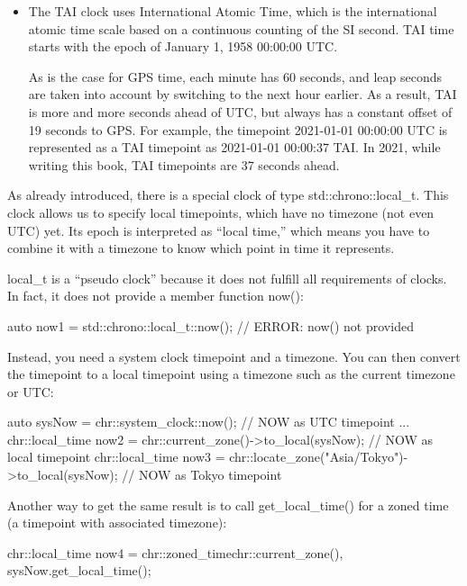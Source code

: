 \begin{itemize}
\item
The TAI clock uses International Atomic Time, which is the international atomic time scale based on a continuous counting of the SI second. TAI time starts with the epoch of January 1, 1958 00:00:00 UTC.

As is the case for GPS time, each minute has 60 seconds, and leap seconds are taken into account by switching to the next hour earlier. As a result, TAI is more and more seconds ahead of UTC, but always has a constant offset of 19 seconds to GPS. For example, the timepoint 2021-01-01 00:00:00 UTC is represented as a TAI timepoint as 2021-01-01 00:00:37 TAI. In 2021, while writing this book, TAI timepoints are 37 seconds ahead.
\end{itemize}


As already introduced, there is a special clock of type std::chrono::local\_t. This clock allows us to specify local timepoints, which have no timezone (not even UTC) yet. Its epoch is interpreted as “local time,” which means you have to combine it with a timezone to know which point in time it represents.

local\_t is a “pseudo clock” because it does not fulfill all requirements of clocks. In fact, it does not provide a member function now():

\begin{cpp}
auto now1 = std::chrono::local_t::now(); // ERROR: now() not provided
\end{cpp}

Instead, you need a system clock timepoint and a timezone. You can then convert the timepoint to a local timepoint using a timezone such as the current timezone or UTC:

\begin{cpp}
auto sysNow = chr::system_clock::now(); // NOW as UTC timepoint
...
chr::local_time now2
	= chr::current_zone()->to_local(sysNow); // NOW as local timepoint
chr::local_time now3
	= chr::locate_zone("Asia/Tokyo")->to_local(sysNow); // NOW as Tokyo timepoint
\end{cpp}

Another way to get the same result is to call get\_local\_time() for a zoned time (a timepoint with associated timezone):

\begin{cpp}
chr::local_time now4 = chr::zoned_time{chr::current_zone(),
										sysNow}.get_local_time();
\end{cpp}

